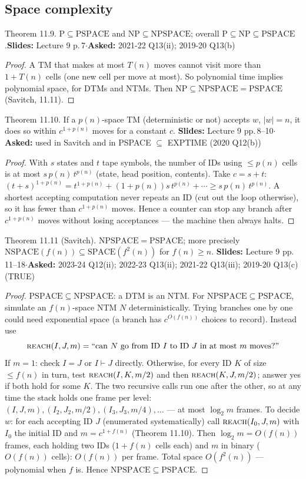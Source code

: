 \documentclass[10.5pt,a4paper]{article}
\newcommand{\src}[2]{{\footnotesize\color{gray!70!black}\textbf{Slides:} #1\enspace$\cdot$\enspace\textbf{Asked:} #2}\par}
\newcommand{\NP}{\mathrm{NP}}
\renewcommand{\P}{\mathrm{P}}
\newcommand{\PS}{\mathrm{PSPACE}}
\newcommand{\NPS}{\mathrm{NPSPACE}}
\begin{document}
\subsection{Space complexity}

\begin{thm}{Theorem 11.9. $\P\subseteq\PS$ and $\NP\subseteq\NPS$; overall $\P\subseteq\NP\subseteq\PS$.}\src{Lecture 9 p.\,7}{2021-22 Q13(ii); 2019-20 Q13(b)}\end{thm}
\begin{proof}
A TM that makes at most $T(n)$ moves cannot visit more than $1+T(n)$ cells (one new cell per move at most). So polynomial time implies
polynomial space, for DTMs and NTMs. Then $\NP\subseteq\NPS=\PS$ (Savitch, 11.11).
\end{proof}

\begin{thm}{Theorem 11.10. If a $p(n)$-space TM (deterministic or not) accepts $w$, $|w|=n$, it does so within $c^{1+p(n)}$ moves for a constant $c$.}
\src{Lecture 9 pp.\,8--10}{used in Savitch and in PSPACE $\subseteq$ EXPTIME (2020 Q12(b))}\end{thm}
\begin{proof}
With $s$ states and $t$ tape symbols, the number of IDs using $\le p(n)$ cells is at most $s\,p(n)\,t^{p(n)}$ (state, head position, contents).
Take $c=s+t$: $(t+s)^{1+p(n)}=t^{1+p(n)}+(1+p(n))s\,t^{p(n)}+\cdots\ge s\,p(n)\,t^{p(n)}$. A shortest accepting computation never repeats an ID
(cut out the loop otherwise), so it has fewer than $c^{1+p(n)}$ moves. Hence a counter can stop any branch after $c^{1+p(n)}$ moves without losing
acceptances --- the machine then always halts.
\end{proof}

\begin{thm}{Theorem 11.11 (Savitch). $\NPS=\PS$; more precisely $\mathrm{NSPACE}(f(n))\subseteq\mathrm{SPACE}(f^2(n))$ for $f(n)\ge n$.}
\src{Lecture 9 pp.\,11--18}{2023-24 Q12(ii); 2022-23 Q13(ii); 2021-22 Q13(iii); 2019-20 Q13(c) (TRUE)}\end{thm}
\begin{proof}
$\PS\subseteq\NPS$: a DTM is an NTM. For $\NPS\subseteq\PS$, simulate an $f(n)$-space NTM $N$ deterministically. Trying branches one by one could
need exponential space (a branch has $c^{O(f(n))}$ choices to record). Instead use
\[\textsc{reach}(I,J,m)=\text{``can $N$ go from ID $I$ to ID $J$ in at most $m$ moves?''}\]
If $m=1$: check $I=J$ or $I\vdash J$ directly. Otherwise, for every ID $K$ of size $\le f(n)$ in turn, test $\textsc{reach}(I,K,m/2)$ and then
$\textsc{reach}(K,J,m/2)$; answer yes if both hold for some $K$. The two recursive calls run one after the other, so at any time the stack holds
one frame per level: $(I,J,m),(I_2,J_2,m/2),(I_3,J_3,m/4),\dots$ --- at most $\log_2m$ frames.
To decide $w$: for each accepting ID $J$ (enumerated systematically) call $\textsc{reach}(I_0,J,m)$ with $I_0$ the initial ID and
$m=c^{1+f(n)}$ (Theorem 11.10). Then $\log_2m=O(f(n))$ frames, each holding two IDs ($1+f(n)$ cells each) and $m$ in binary ($O(f(n))$ cells):
$O(f(n))$ per frame. Total space $O(f^2(n))$ --- polynomial when $f$ is. Hence $\NPS\subseteq\PS$.
\end{proof}
\end{document}
